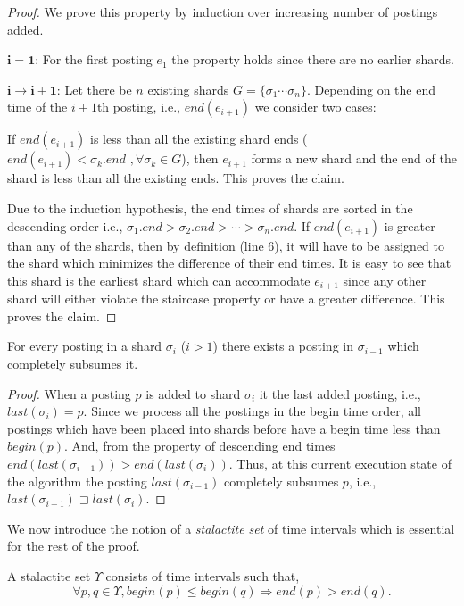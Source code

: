 \begin{proof}{} We prove this property by induction over increasing number of postings added. 

$\mathbf{i = 1}$: For the first posting $e_1$ the property holds since there are no earlier shards. 

$\mathbf{i \rightarrow i+1}$: Let there be $n$ existing shards $G = \{ \sigma_1 \cdots \sigma_n \}$. Depending on the end time of the $i+1$th posting, i.e., $end(e_{i+1})$ we consider two cases:

If $end(e_{i+1})$ is less than all the existing shard ends  ($end(e_{i+1}) < \sigma_k.end \,\, ,\forall \sigma_k \in G$), then $e_{i+1}$ forms a new shard and the end of the shard is less than all the existing ends. This proves the claim.

Due to the induction hypothesis, the end times of shards are sorted in the descending order i.e., $\sigma_1.end > \sigma_2.end > \cdots > \sigma_n.end$. If $end(e_{i+1})$ is greater than any of the shards, then by definition (line 6), it will have to be assigned to the shard which minimizes the difference of their end times. It is easy to see that this shard is the earliest shard which can accommodate $e_{i+1}$ since any other shard will either violate the staircase property or have a greater difference. This proves the claim. 
\end{proof}


\begin{lemma}
\label{lemma:subsumption}
For every posting in a shard $\sigma_i$ ($i > 1$) there exists a posting in $\sigma_{i-1}$ which completely subsumes it.
\end{lemma}
\begin{proof}{} When a posting $p$ is added to shard $\sigma_i$ it the last added posting, i.e., $last(\sigma_i) = p$. Since we process all the postings in the begin time order, all postings which have been placed into shards before have a begin time less than $begin(p)$. And, from the property of descending end times $end(last(\sigma_{i-1})) > end(last(\sigma_{i}))$. Thus, at this current execution state of the algorithm the posting $last(\sigma_{i-1})$ completely subsumes $p$, i.e., $last(\sigma_{i-1}) \sqsupset last(\sigma_{i}) $.  
\end{proof}


We now introduce the notion of a \emph{stalactite set} of time intervals which is essential for the rest of the proof. 

\begin{definition}
	\label{def:stalactite}
	A stalactite set $\Upsilon$ consists of time intervals such that,
	$$\forall p, q \in \Upsilon, begin(p) \leq begin(q) \Rightarrow end(p) > end (q) .$$
\end{definition}

